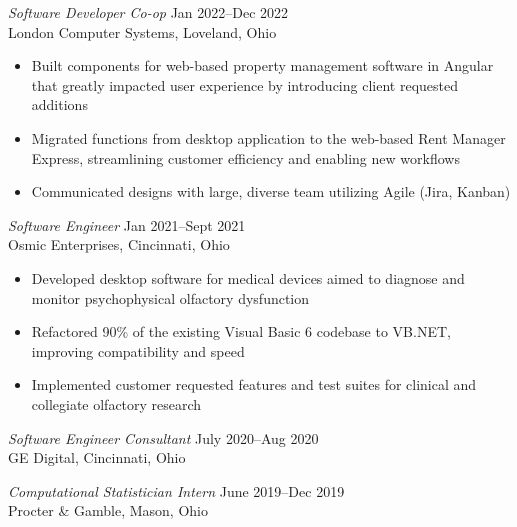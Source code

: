 \documentclass[margin]{res} %
\begin{document}
\begin{resume}
{\sl Software Developer Co-op} \hfill {\color{black} Jan 2022–Dec 2022}  \\
London Computer Systems, Loveland, Ohio 
\vspace{1mm}
\begin{itemize}  %
\item Built components for web-based property management software in Angular that greatly impacted user experience by introducing client requested additions
\item Migrated functions from desktop application to the web-based Rent Manager Express, streamlining customer efficiency and enabling new workflows
\item Communicated designs with large, diverse team utilizing Agile (Jira, Kanban)
\end{itemize}


{\sl Software Engineer} \hfill {\color{black} Jan 2021–Sept 2021}  \\
Osmic Enterprises, Cincinnati, Ohio
\vspace{1mm}
\begin{itemize} %
\item Developed desktop software for medical devices aimed to diagnose and monitor psychophysical olfactory dysfunction
\item Refactored 90\% of the existing Visual Basic 6 codebase to VB.NET, improving compatibility and speed   
\item Implemented customer requested features and test suites for clinical and collegiate olfactory research
\end{itemize}


{\sl Software Engineer Consultant} \hfill {\color{black} July 2020–Aug 2020}  \\
GE Digital, Cincinnati, Ohio 

{\sl Computational Statistician Intern} \hfill {\color{black} June 2019–Dec 2019}  \\
Procter \& Gamble, Mason, Ohio 

\pagebreak



\end{resume}
\end{document}
